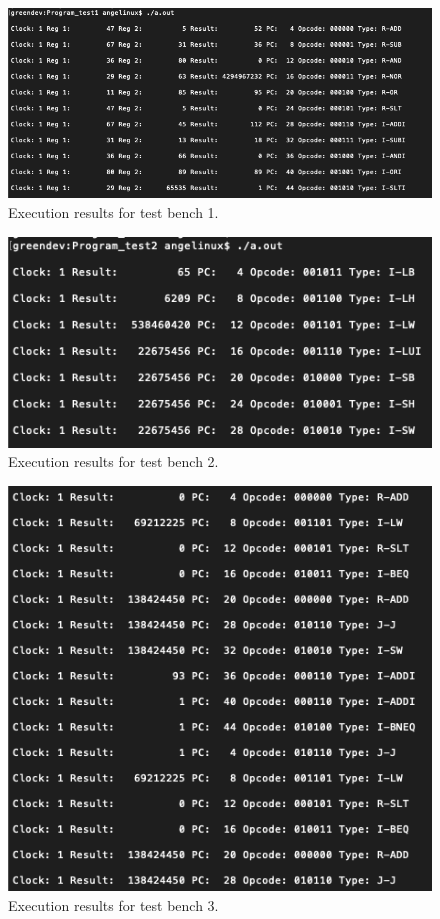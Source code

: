 \documentclass[conference]{IEEEtran}
\begin{document}
\begin{figure}[h]
\includegraphics[scale=0.33]{test_bench_1.png}
\caption{Execution results for test bench 1.}
\label{result1}
\end{figure}

\begin{figure}[h]
\includegraphics[scale=0.55]{test_bench_2.png}
\caption{Execution results for test bench 2.}
\label{result_factorial}
\end{figure}

\begin{figure}[h]
\includegraphics[scale=0.5]{test_bench_3.png}
\caption{Execution results for test bench 3.}
\label{result2}
\end{figure}
\end{document}
